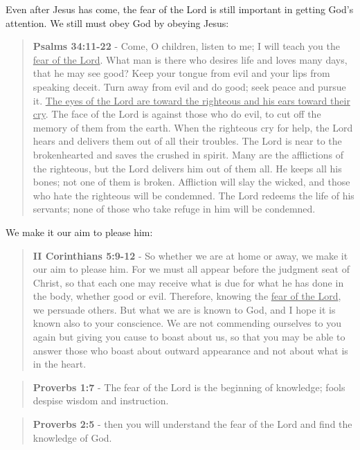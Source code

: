 \documentclass[11pt]{article}
\begin{document}
Even after Jesus has come, the fear of the Lord is still important in getting God's attention. We still must obey God by obeying Jesus:

\begin{quote}
\textbf{Psalms 34:11-22} - Come, O children, listen to me; I will teach you the \uline{fear of the Lord}. What man is there who desires life and loves many days, that he may see good? Keep your tongue from evil and your lips from speaking deceit. Turn away from evil and do good; seek peace and pursue it. \uline{The eyes of the Lord are toward the righteous and his ears toward their cry}. The face of the Lord is against those who do evil, to cut off the memory of them from the earth. When the righteous cry for help, the Lord hears and delivers them out of all their troubles. The Lord is near to the brokenhearted and saves the crushed in spirit. Many are the afflictions of the righteous, but the Lord delivers him out of them all. He keeps all his bones; not one of them is broken. Affliction will slay the wicked, and those who hate the righteous will be condemned. The Lord redeems the life of his servants; none of those who take refuge in him will be condemned.
\end{quote}

We make it our aim to please him:

\begin{quote}
\textbf{II Corinthians 5:9-12} - So whether we are at home or away, we make it our aim to please him. For we must all appear before the judgment seat of Christ, so that each one may receive what is due for what he has done in the body, whether good or evil. Therefore, knowing the \uline{fear of the Lord}, we persuade others. But what we are is known to God, and I hope it is known also to your conscience. We are not commending ourselves to you again but giving you cause to boast about us, so that you may be able to answer those who boast about outward appearance and not about what is in the heart.
\end{quote}

\begin{quote}
\textbf{Proverbs 1:7} - The fear of the Lord is the beginning of knowledge; fools despise wisdom and instruction.
\end{quote}

\begin{quote}
\textbf{Proverbs 2:5} - then you will understand the fear of the Lord and find the knowledge of God.
\end{quote}
\end{document}
